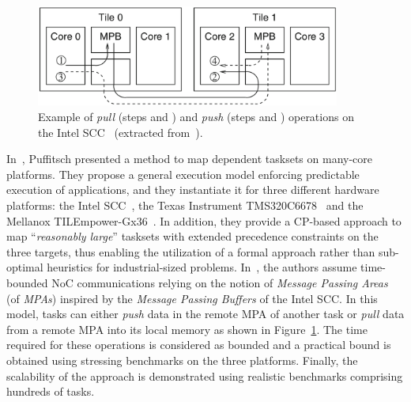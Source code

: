 \documentclass[main.tex]{subfiles}
\begin{document}
\begin{figure}
    \centering
    \includegraphics[width=10cm]{imgs/png/stateOfTheArt_2_pushPullSCC.png}
    \caption{Example of \emph{pull} (steps  and )  and
    \emph{push} (steps  and ) operations on the Intel
    SCC~\cite{intel_scc} (extracted from~\cite{PuffitschNP15}).}
    \label{fig_stateOfTheArt_2_pushPullSCC}
\end{figure}
In~\cite{PuffitschNP15}, Puffitsch \etal presented a method to map dependent
tasksets on many-core platforms. They propose a general execution model
enforcing predictable execution of applications, and they instantiate it for
three different hardware platforms: the Intel SCC~\cite{intel_scc}, the Texas
Instrument TMS320C6678~\cite{TMS320C6678} and the Mellanox
TILEmpower-Gx36~\cite{TileGx36}. In addition, they provide a CP-based approach
to map ``\emph{reasonably large}'' tasksets with extended precedence
constraints on the three targets, thus enabling the utilization of a formal
approach rather than sub-optimal heuristics for industrial-sized problems.
In~\cite{PuffitschNP15}, the authors assume time-bounded NoC communications
relying on the notion of \emph{Message Passing Areas} (of \emph{MPAs}) inspired
by the \emph{Message Passing Buffers} of the Intel SCC. In this model, tasks
can either \emph{push} data in the remote MPA of another task or \emph{pull}
data from a remote MPA into its local memory as shown in
Figure~\ref{fig_stateOfTheArt_2_pushPullSCC}. The time required for these
operations is considered as bounded and a practical bound is obtained using
stressing benchmarks on the three platforms. Finally, the scalability of the
approach is demonstrated using realistic benchmarks comprising hundreds of
tasks. 
\end{document}
